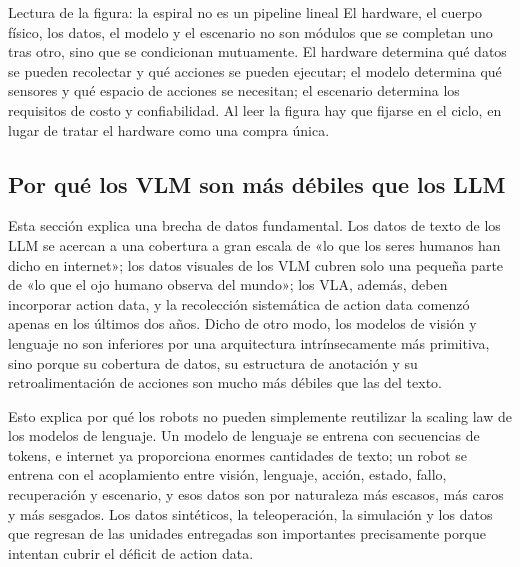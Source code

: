\documentclass[a4paper]{article}
\begin{document}
\begin{knowledgebox}{Lectura de la figura: la espiral no es un pipeline lineal}
El hardware, el cuerpo físico, los datos, el modelo y el escenario no son módulos que se completan uno tras otro, sino que se condicionan mutuamente. El hardware determina qué datos se pueden recolectar y qué acciones se pueden ejecutar; el modelo determina qué sensores y qué espacio de acciones se necesitan; el escenario determina los requisitos de costo y confiabilidad. Al leer la figura hay que fijarse en el ciclo, en lugar de tratar el hardware como una compra única.
\end{knowledgebox}

\subsection{Por qué los VLM son más débiles que los LLM}

Esta sección explica una brecha de datos fundamental. Los datos de texto de los LLM se acercan a una cobertura a gran escala de «lo que los seres humanos han dicho en internet»; los datos visuales de los VLM cubren solo una pequeña parte de «lo que el ojo humano observa del mundo»; los VLA, además, deben incorporar action data, y la recolección sistemática de action data comenzó apenas en los últimos dos años. Dicho de otro modo, los modelos de visión y lenguaje no son inferiores por una arquitectura intrínsecamente más primitiva, sino porque su cobertura de datos, su estructura de anotación y su retroalimentación de acciones son mucho más débiles que las del texto.

Esto explica por qué los robots no pueden simplemente reutilizar la scaling law de los modelos de lenguaje. Un modelo de lenguaje se entrena con secuencias de tokens, e internet ya proporciona enormes cantidades de texto; un robot se entrena con el acoplamiento entre visión, lenguaje, acción, estado, fallo, recuperación y escenario, y esos datos son por naturaleza más escasos, más caros y más sesgados. Los datos sintéticos, la teleoperación, la simulación y los datos que regresan de las unidades entregadas son importantes precisamente porque intentan cubrir el déficit de action data.
\end{document}
